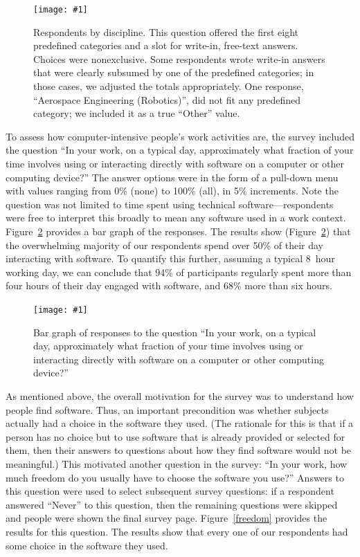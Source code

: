 \documentclass[review]{elsarticle}
\newcommand{\includefile}[1]{\texttt{[image: \#1]}}
\begin{document}
\begin{figure}[hbt]
  \centering
  \includefile{files/plots/respondents-by-discipline.pdf}
  \caption{Respondents by discipline.  This question offered the first eight predefined categories and a slot for write-in, free-text answers.  Choices were nonexclusive.  Some respondents wrote write-in answers that were clearly subsumed by one of the predefined categories; in those cases, we adjusted the totals appropriately.  One response, ``Aerospace Engineering (Robotics)'', did not fit any predefined category; we included it as a true ``Other'' value.}
  \label{disciplines}
\end{figure}

To assess how computer-intensive people's work activities are, the survey included the question ``In your work, on a typical day, approximately what fraction of your time involves using or interacting directly with software on a computer or other computing device?''  The answer options were in the form of a pull-down menu with values ranging from 0\% (none) to 100\% (all), in 5\% increments.  Note the question was not limited to time spent using technical software---respondents were free to interpret this broadly to mean any software used in a work context.  Figure~\ref{time-with-software} provides a bar graph of the responses.    The results show (Figure~\ref{time-with-software}) that the overwhelming majority of our respondents spend over 50\% of their day interacting with software.  To quantify this further, assuming a typical 8~hour working day, we can conclude that 94\% of participants regularly spent more than four hours of their day engaged with software, and 68\% more than six hours.

\begin{figure}[b]
  \centering
  \includefile{files/plots/bar-graph-time-spent-with-software.pdf}
  \caption{Bar graph of responses to the question ``In your work, on a
    typical day, approximately what fraction of your time involves using or
    interacting directly with software on a computer or other computing
    device?''}
  \label{time-with-software}
\end{figure}

As mentioned above, the overall motivation for the survey was to understand how people find software.  Thus, an important precondition was whether subjects actually had a choice in the software they used.  (The rationale for this is that if a person has no choice but to use software that is already provided or selected for them, then their answers to questions about how they find software would not be meaningful.)  This motivated another question in the survey: ``In your work, how much freedom do you usually have to choose the software you use?''  Answers to this question were used to select subsequent survey questions: if a respondent answered ``Never'' to this question, then the remaining questions were skipped and people were shown the final survey page.  Figure~\ref{freedom} provides the results for this question.  The results show that every one of our respondents had some choice in the software they used.  %
\end{document}
